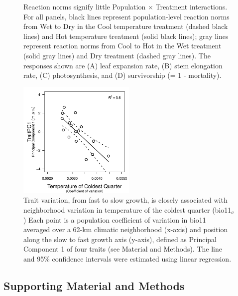 \documentclass[11pt, oneside]{article}
\begin{document}
\begin{figure}
\begin{subfigure}{0.4\textwidth}
        \label{fig:FigS_MortRxnNorm}
    \end{subfigure}
\caption[Reaction norms]{Reaction norms signify little Population $\times$ Treatment interactions. For all panels, black lines represent population-level reaction norms from Wet to Dry in the Cool temperature treatment (dashed black lines) and Hot temperature treatment (solid black lines); gray lines represent reaction norms from Cool to Hot in the Wet treatment (solid gray lines) and Dry treatment (dashed gray lines). The responses shown are (A) leaf expansion rate, (B) stem elongation rate, (C) photosynthesis, and (D) survivorship (= 1 - mortality).}
	\label{fig:FigS_RxnNorms}
\end{figure}


\begin{figure}[h!]
\centerline{\includegraphics[width=0.5\textwidth]{Figures/FigureS_bio11PC1.pdf}}
\fontsize{10}{12}
\selectfont
\caption[Trait PC1 versus bio11_cva_SA]{Trait variation, from fast to slow growth, is closely associated with neighborhood variation in temperature of the coldest quarter (bio11$_\sigma$) Each point is a population coefficient of variation in bio11 averaged over a 62-km climatic neighborhood  (x-axis) and position along the slow to fast growth axis (y-axis), defined as Principal Component 1 of four traits (see Material and Methods). The line and 95\% confidence intervals were estimated using linear regression.}
\label{fig:FigS_bio11PC1}
\end{figure}

\clearpage


\subsection*{Supporting Material and Methods}
\end{document}
